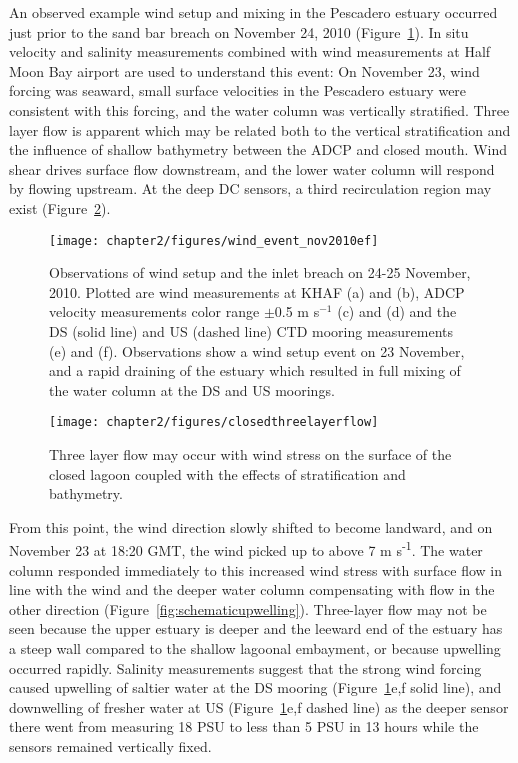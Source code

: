 An observed example wind setup and mixing in the Pescadero estuary occurred just prior to the sand bar breach on November 24, 2010 (Figure~\ref{fig:closed_UVwindsalt}). In situ velocity and salinity measurements combined with wind measurements at Half Moon Bay airport are used to understand this event: 
On November 23, wind forcing was seaward, small surface velocities in the Pescadero estuary were consistent with this forcing, and the water column was vertically stratified. Three layer flow is apparent which may be related both to the vertical stratification and the influence of shallow bathymetry between the ADCP and closed mouth. Wind shear drives surface flow downstream, and the lower water column will respond by flowing upstream. At the deep DC sensors, a third recirculation region may exist (Figure~\ref{fig:schematic3lf}).


\begin{figure}[p]
	\centering
	\texttt{[image: chapter2/figures/wind\_event\_nov2010ef]}
\caption{Observations of wind setup and the inlet breach on 24-25 November, 2010. Plotted are wind measurements at KHAF (a) and (b), ADCP velocity measurements color range $\pm $0.5 m s$^{-1}$ (c) and (d) and the DS (solid line) and US (dashed line) CTD mooring measurements (e) and (f). Observations show a wind setup event on 23 November, and a rapid draining of the estuary which resulted in full mixing of the water column at the DS and US moorings.}
\label{fig:closed_UVwindsalt}
\end{figure}


\begin{figure}[h!]
	\centering
	\texttt{[image: chapter2/figures/closedthreelayerflow]}
\caption{Three layer flow may occur with wind stress on the surface of the closed lagoon coupled with the effects of stratification and bathymetry.} \label{fig:schematic3lf}
\end{figure}


From this point, the wind direction slowly shifted to become landward, and on November 23 at 18:20 GMT, the wind picked up to above 7 m s\textsuperscript{-1}. The water column responded immediately to this increased wind stress with surface flow in line with the wind and the  deeper water column compensating with flow in the other direction (Figure~\ref{fig:schematicupwelling}). Three-layer flow may not be seen because the upper estuary is deeper and the leeward end of the estuary has a steep wall compared to the shallow lagoonal embayment, or because upwelling occurred rapidly. Salinity measurements suggest that the strong wind forcing caused upwelling of saltier water at the DS mooring (Figure~\ref{fig:closed_UVwindsalt}e,f solid line), and downwelling of fresher water at US (Figure~\ref{fig:closed_UVwindsalt}e,f dashed line) as the deeper sensor there went from measuring 18 PSU to less than 5 PSU in 13 hours while the sensors remained vertically fixed.


